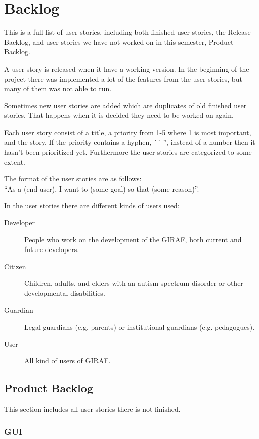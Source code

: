 \chapter{Backlog}\label{Appendix_secBacklog}
This is a full list of user stories, including both finished user stories, the Release Backlog, and user stories we have not worked on in this semester, Product Backlog.

A user story is released when it have a working version. In the beginning of the project there was implemented a lot of the features from the user stories, but many of them was not able to run.

Sometimes new user stories are added which are duplicates of old finished user stories. That happens when it is decided they need to be worked on again.

Each user story consist of a title, a priority from 1-5 where 1 is most important, and the story. If the priority contains a hyphen, ´´-'', instead of a number then it hasn't been prioritized yet.
Furthermore the user stories are categorized to some extent.

The format of the user stories are as follows: \\
``As a (end user), I want to (some goal) so that (some reason)''.

In the user stories there are different kinds of users used:
\begin{description}
	\item [Developer] People who work on the development of the GIRAF, both current and future developers.
	\item [Citizen] Children, adults, and elders with an autism spectrum disorder or other developmental disabilities.
	\item [Guardian] Legal guardians (e.g. parents) or institutional guardians (e.g. pedagogues).
	\item [User] All kind of users of GIRAF.
\end{description}

\section{Product Backlog}
This section includes all user stories there is not finished.

\subsection{GUI}


